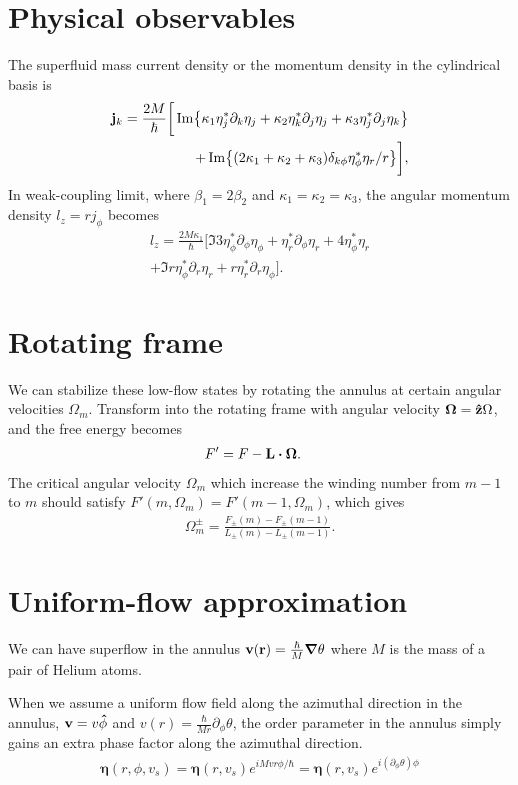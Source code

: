 \documentclass[aps,prl,preprint]{revtex4-2}
\begin{document}
\section{Physical observables}

The superfluid mass current density or the momentum density in the cylindrical basis is
\begin{align}\label{j}
    \vb{j}_k=\frac{2M}{\hbar}\bigg[\Im{\kappa_1\eta_j^*\partial_k\eta_j+\kappa_2\eta_k^*\partial_j\eta_j+\kappa_3\eta_j^*\partial_j\eta_k}\nonumber\\
    +\Im{(2\kappa_1+\kappa_2+\kappa_3)\delta_{k\phi}\eta_\phi^*\eta_r/r}\bigg],
\end{align}
In weak-coupling limit,
where $\beta_1=2\beta_2$ and $\kappa_1=\kappa_2=\kappa_3$, the angular momentum
density $l_z=rj_\phi$ becomes
\begin{align}\label{l_density}
     l_z=\frac{2M\kappa_1}{\hbar}\bigg[\Im{3\eta_\phi^*\partial_\phi\eta_\phi+\eta_r^*\partial_\phi\eta_r+4\eta_\phi^*\eta_r}\nonumber\\
     +\Im{r\eta_\phi^*\partial_r\eta_r+r\eta_r^*\partial_r\eta_\phi}\bigg].
\end{align}

\section{Rotating frame}

We can stabilize these low-flow states by rotating the annulus at
certain angular velocities $\Omega_m$. Transform into the rotating frame
with angular velocity $\vb{\Omega}=\vu{z}\Omega$, and the free energy becomes
\begin{align}
    F'&=F-\vb{L}\vdot\vb{\Omega}.
\end{align}
The critical angular velocity $\Omega_m$ which increase the winding number from $m-1$ to $m$ should
satisfy $F'(m,\Omega_m)=F'(m-1,\Omega_m)$, which gives
\begin{align}
    \Omega_m^\pm=\frac{F_\pm(m) - F_\pm(m-1)}{L_\pm(m) - L_\pm(m-1)}. \label{omega_m}
\end{align}

\section{Uniform-flow approximation}
We can have superflow in the annulus $\vb{v}(\vb{r}) = \frac{\hbar}{M}\grad{\theta}$ where $M$ is the mass of a pair of Helium atoms.

When we assume a uniform flow field along the azimuthal direction in the annulus,
$\vb{v} = v\vu{\phi}$ and $v(r) = \frac{\hbar}{Mr}\partial_\phi{\theta}$, the order parameter in the annulus simply gains an extra phase factor along the azimuthal direction.
\begin{align}
    \bm{\eta}(r, \phi, v_s) = \bm{\eta}(r, v_s)e^{iMvr\phi/\hbar} = \bm{\eta}(r, v_s)e^{i(\partial_\phi\theta)\phi} 
\end{align}
\end{document}
